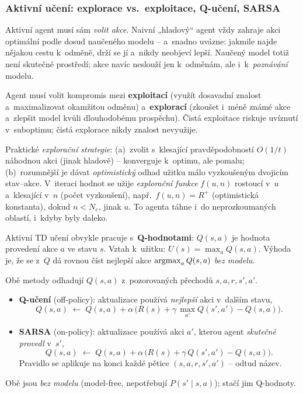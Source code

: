 \subsubsection*{Aktivní učení: explorace vs.\ exploitace, Q-učení, SARSA}

Aktivní agent musí sám \emph{volit akce}. Naivní „hladový`` agent vždy zahraje akci optimální podle dosud naučeného modelu -- a~snadno uvázne: jakmile najde nějakou cestu k~odměně, drží se jí a~nikdy neobjeví lepší. Naučený model totiž není skutečné prostředí; akce navíc neslouží jen k~odměnám, ale i~k~\emph{poznávání} modelu.

\begin{definice}
Agent musí volit kompromis mezi \textbf{exploitací} (využít dosavadní znalost a~maximalizovat okamžitou odměnu) a~\textbf{explorací} (zkoušet i~méně známé akce a~zlepšit model kvůli dlouhodobému prospěchu). Čistá exploitace riskuje uvíznutí v~suboptimu; čistá explorace nikdy znalost nevyužije.
\end{definice}

\begin{intuice}
Praktické \emph{explorační strategie}: (a)~zvolit s~klesající pravděpodobností $O(1/t)$ náhodnou akci (jinak hladově) -- konverguje k~optimu, ale pomalu; (b)~rozumnější je dávat \emph{optimistický} odhad užitku málo vyzkoušeným dvojicím stav--akce. V~iteraci hodnot se užije \emph{explorační funkce} $f(u,n)$ rostoucí v~$u$ a~klesající v~$n$ (počet vyzkoušení), např.\ $f(u,n)=R^{+}$ (optimistická konstanta), dokud $n<N_e$, jinak $u$. To agenta táhne i~do neprozkoumaných oblastí, i~kdyby byly daleko.
\end{intuice}

Aktivní TD učení obvykle pracuje s~\textbf{Q-hodnotami}: $Q(s,a)$ je hodnota provedení akce $a$ ve stavu $s$. Vztah k~užitku: $U(s)=\max_a Q(s,a)$. Výhoda je, že se z~$Q$ dá rovnou číst nejlepší akce $\operatorname*{argmax}_a Q(s,a)$ \emph{bez modelu}.

\begin{definice}
Obě metody odhadují $Q(s,a)$ z~pozorovaných přechodů $s,a,r,s',a'$.
\begin{itemize}
  \item \textbf{Q-učení} (off-policy): aktualizace používá \emph{nejlepší} akci v~dalším stavu,
  \[ Q(s,a) \;\leftarrow\; Q(s,a) + \alpha\,\big(R(s) + \gamma\,\max_{a'}Q(s',a') - Q(s,a)\big). \]
  \item \textbf{SARSA} (on-policy): aktualizace používá akci $a'$, kterou agent \emph{skutečně provedl} v~$s'$,
  \[ Q(s,a) \;\leftarrow\; Q(s,a) + \alpha\,\big(R(s) + \gamma\,Q(s',a') - Q(s,a)\big). \]
  Pravidlo se aplikuje na konci každé pětice $(s,a,r,s',a')$ -- odtud název.
\end{itemize}
Obě jsou \emph{bez modelu} (model-free, nepotřebují $P(s'\mid s,a)$); stačí jim Q-hodnoty.
\end{definice}


